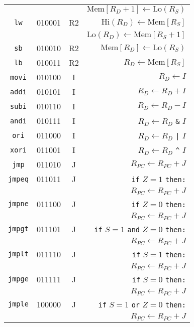 \documentclass[12pt]{scrartcl}
\begin{document}
\begin{center}
\begin{longtable}{c c c r}
    & & &                         $\mathrm{Mem}[R_D+1] \gets \mathrm{Lo}(R_S)$ \\
    \texttt{lw}   & 010001 & R2 & $\mathrm{Hi}(R_D) \gets \mathrm{Mem}[R_S]$ \\
    & & &                         $\mathrm{Lo}(R_D) \gets \mathrm{Mem}[R_S+1]$ \\
    \texttt{sb}   & 010010 & R2 & $\mathrm{Mem}[R_D] \gets \mathrm{Lo}(R_S)$ \\
    \texttt{lb}   & 010011 & R2 & $R_D \gets \mathrm{Mem}[R_S]$ \\
    \texttt{movi} & 010100 & I  & $R_D \gets I$ \\
    \texttt{addi} & 010101 & I  & $R_D \gets R_D + I$ \\
    \texttt{subi} & 010110 & I  & $R_D \gets R_D - I$ \\
    \texttt{andi} & 010111 & I  & $R_D \gets R_D$ \texttt{\&} $I$ \\
    \texttt{ori}  & 011000 & I  & $R_D \gets R_D$ \texttt{|} $I$ \\
    \texttt{xori} & 011001 & I  & $R_D \gets R_D$ \texttt{\^{}} $I$ \\
    \texttt{jmp}  & 011010 & J  & $R_{PC} \gets R_{PC} + J$ \\
    \texttt{jmpeq}& 011011 & J  & \texttt{if} $Z = 1$ \texttt{then:} \\
    & & &                         $R_{PC} \gets R_{PC} + J$ \\
    \texttt{jmpne}& 011100 & J  & \texttt{if} $Z = 0$ \texttt{then:} \\
    & & &                         $R_{PC} \gets R_{PC} + J$ \\
    \texttt{jmpgt}& 011101 & J  & \texttt{if} $S = 1$ \texttt{and} $Z = 0$ \texttt{then:} \\
    & & &                         $R_{PC} \gets R_{PC} + J$ \\
    \texttt{jmplt}& 011110 & J  & \texttt{if} $S = 1$ \texttt{then:} \\
    & & &                         $R_{PC} \gets R_{PC} + J$ \\
    \texttt{jmpge}& 011111 & J  & \texttt{if} $S = 0$ \texttt{then:} \\
    & & &                         $R_{PC} \gets R_{PC} + J$ \\
    \texttt{jmple}& 100000 & J  & \texttt{if} $S = 1$ \texttt{or} $Z = 0$ \texttt{then:} \\
    & & &                         $R_{PC} \gets R_{PC} + J$ \\
  \end{longtable}
\end{center}
\end{document}
